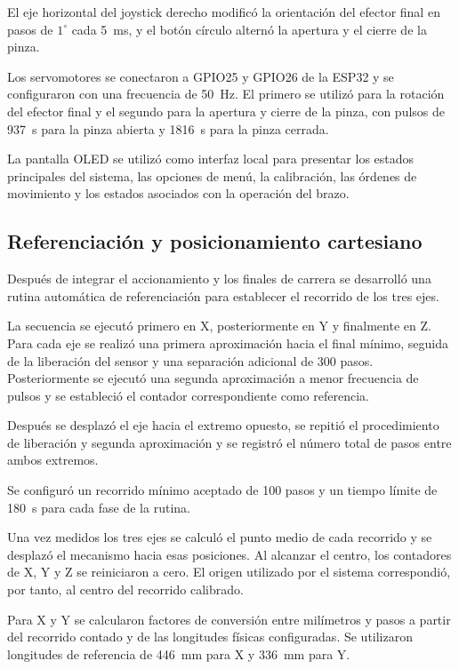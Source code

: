 El eje horizontal del joystick derecho modificó la orientación del efector final en pasos de $1^\circ$ cada 5~ms, y el botón círculo alternó la apertura y el cierre de la pinza.

Los servomotores se conectaron a GPIO25 y GPIO26 de la ESP32 y se configuraron con una frecuencia de 50~Hz. El primero se utilizó para la rotación del efector final y el segundo para la apertura y cierre de la pinza, con pulsos de 937~\textmu s para la pinza abierta y 1816~\textmu s para la pinza cerrada.

La pantalla OLED se utilizó como interfaz local para presentar los estados principales del sistema, las opciones de menú, la calibración, las órdenes de movimiento y los estados asociados con la operación del brazo.


\subsection{Referenciación y posicionamiento cartesiano}

Después de integrar el accionamiento y los finales de carrera se desarrolló una rutina automática de referenciación para establecer el recorrido de los tres ejes.

La secuencia se ejecutó primero en X, posteriormente en Y y finalmente en Z. Para cada eje se realizó una primera aproximación hacia el final mínimo, seguida de la liberación del sensor y una separación adicional de 300 pasos. Posteriormente se ejecutó una segunda aproximación a menor frecuencia de pulsos y se estableció el contador correspondiente como referencia.

Después se desplazó el eje hacia el extremo opuesto, se repitió el procedimiento de liberación y segunda aproximación y se registró el número total de pasos entre ambos extremos.

Se configuró un recorrido mínimo aceptado de 100 pasos y un tiempo límite de 180~s para cada fase de la rutina.

Una vez medidos los tres ejes se calculó el punto medio de cada recorrido y se desplazó el mecanismo hacia esas posiciones. Al alcanzar el centro, los contadores de X, Y y Z se reiniciaron a cero. El origen utilizado por el sistema correspondió, por tanto, al centro del recorrido calibrado.

Para X y Y se calcularon factores de conversión entre milímetros y pasos a partir del recorrido contado y de las longitudes físicas configuradas. Se utilizaron longitudes de referencia de 446~mm para X y 336~mm para Y.

